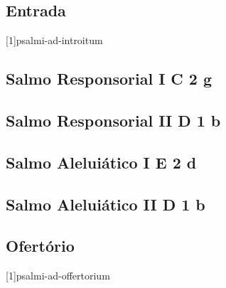 
\subsection{Entrada}\label{subsection:missae-rituales/missa-in-professione-religiosa/introitus}
[1]{psalmi-ad-introitum}

\subsection[Salmo Responsorial I]{Salmo Responsorial I \textmd{C 2 g}}\label{subsection:missae-rituales/missa-in-professione-religiosa/psalmus-responsorius-1}

\AllowPageFlush

\subsection[Salmo Responsorial II]{Salmo Responsorial II \textmd{D 1 b}}\label{subsection:missae-rituales/missa-in-professione-religiosa/psalmus-responsorius-2}

\AllowPageFlush

\subsection[Salmo Aleluiático I]{Salmo Aleluiático I \textmd{E 2 d}}\label{subsection:missae-rituales/missa-in-professione-religiosa/psalmus-alleluiaticus-1}

\AllowPageFlush

\subsection[Salmo Aleluiático II]{Salmo Aleluiático II \textmd{D 1 b}}\label{subsection:missae-rituales/missa-in-professione-religiosa/psalmus-alleluiaticus-1}

\AllowPageFlush

\subsection{Ofertório}\label{subsection:missae-rituales/missa-in-professione-religiosa/offertorium}
[1]{psalmi-ad-offertorium}

